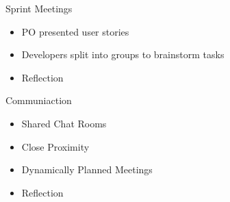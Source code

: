 \begin{frame}{Sprint Meetings}
\begin{itemize} 
	\item PO presented user stories
    \item Developers split into groups to brainstorm tasks
	\item Reflection
\end{itemize}
\end{frame}

\begin{frame}{Communiaction}
\begin{itemize} 
	\item Shared Chat Rooms
	\item Close Proximity
	\item Dynamically Planned Meetings
	\item Reflection
\end{itemize}
\end{frame}
